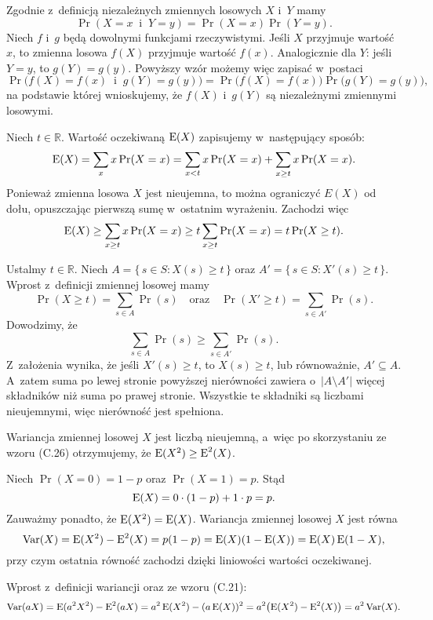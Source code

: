 \exercise %
Zgodnie z~definicją niezależnych zmiennych losowych $X$ i~$Y$ mamy
\[
	\Pr(X=x\;\;\text{i}\;\;Y=y) = \Pr(X=x)\Pr(Y=y).
\]
Niech $f$ i~$g$ będą dowolnymi funkcjami rzeczywistymi.
Jeśli $X$ przyjmuje wartość $x$, to zmienna losowa $f(X)$ przyjmuje wartość $f(x)$.
Analogicznie dla $Y$: jeśli $Y=y$, to $g(Y)=g(y)$.
Powyższy wzór możemy więc zapisać w~postaci
\[
	\Pr\bigl(f(X)=f(x)\;\;\text{i}\;\;g(Y)=g(y)\bigr) = \Pr\bigl(f(X)=f(x)\bigr)\Pr\bigl(g(Y)=g(y)\bigr),
\]
na podstawie której wnioskujemy, że $f(X)$ i~$g(Y)$ są niezależnymi zmiennymi losowymi.

\exercise %
Niech $t\in\mathbb{R}$.
Wartość oczekiwaną $\operatorname{E}(X)$ zapisujemy w~następujący sposób:
\[
    \operatorname{E}(X) = \sum_xx\Pr(X=x) = \sum_{x<t}x\Pr(X=x)+\sum_{x\ge t}x\Pr(X=x).
\]
Ponieważ zmienna losowa $X$ jest nieujemna, to można ograniczyć $E(X)$ od dołu, opuszczając pierwszą sumę w~ostatnim wyrażeniu.
Zachodzi więc
\[
    \operatorname{E}(X) \ge \sum_{x\ge t}x\Pr(X=x) \ge t\sum_{x\ge t}\Pr(X=x) = t\Pr(X\ge t).
\]

\exercise %
Ustalmy $t\in\mathbb{R}$.
Niech $A=\{\,s\in S:X(s)\ge t\,\}$ oraz $A'=\{\,s\in S:X'(s)\ge t\,\}$.
Wprost z~definicji zmiennej losowej mamy
\[
	\Pr(X\ge t) = \sum_{s\in A}\Pr(s) \quad\text{oraz}\quad \Pr(X'\ge t) = \sum_{s\in A'}\Pr(s).
\]
Dowodzimy, że
\[
	\sum_{s\in A}\Pr(s) \ge \sum_{s\in A'}\Pr(s).
\]
Z~założenia wynika, że jeśli $X'(s)\ge t$, to $X(s)\ge t$, lub równoważnie, $A'\subseteq A$.
A~zatem suma po lewej stronie powyższej nierówności zawiera o~$|A\setminus A'|$ więcej składników niż suma po prawej stronie.
Wszystkie te składniki są liczbami nieujemnymi, więc nierówność jest spełniona.

\exercise %
Wariancja zmiennej losowej $X$ jest liczbą nieujemną, a~więc po skorzystaniu ze wzoru (C.26) otrzymujemy, że $\operatorname{E}(X^2)\ge\operatorname{E}^2(X)$.

\exercise %
Niech $\Pr(X=0)=1-p$ oraz $\Pr(X=1)=p$.
Stąd
\[
    \operatorname{E}(X)=0\cdot(1-p)+1\cdot p=p.
\]
Zauważmy ponadto, że $\operatorname{E}(X^2)=\operatorname{E}(X)$.
Wariancja zmiennej losowej $X$ jest równa
\[
	\operatorname{Var}(X) = \operatorname{E}(X^2)-\operatorname{E}^2(X) = p(1-p) = \operatorname{E}(X)(1-\operatorname{E}(X)) = \operatorname{E}(X)\operatorname{E}(1-X),
\]
przy czym ostatnia równość zachodzi dzięki liniowości wartości oczekiwanej.

\exercise %
Wprost z~definicji wariancji oraz ze wzoru (C.21):
\[
	\operatorname{Var}(aX) = \operatorname{E}(a^2X^2)-\operatorname{E}^2(aX) = a^2\operatorname{E}(X^2)-(a\operatorname{E}(X))^2 = a^2\bigl(\operatorname{E}(X^2)-\operatorname{E}^2(X)\bigr) = a^2\operatorname{Var}(X).
\]
